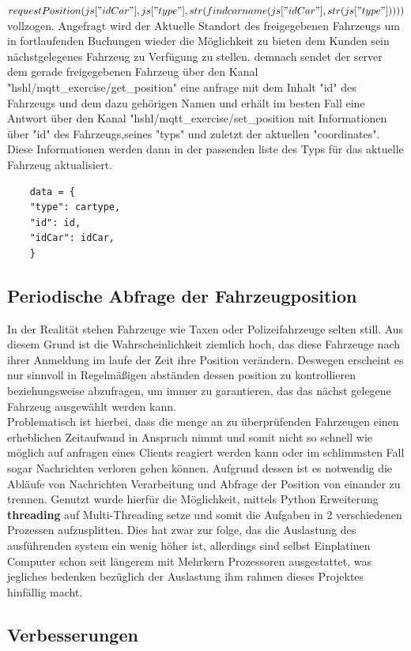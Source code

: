 \documentclass[conference]{IEEEtran}
\begin{document}
\textit{$requestPosition(js["idCar"],js["type"],\\str(findcarname(js["idCar"],str(js["type"]))))$}
vollzogen.  Angefragt wird der Aktuelle Standort des freigegebenen Fahrzeugs um in fortlaufenden Buchungen wieder die Möglichkeit zu bieten dem Kunden sein nächstgelegenes Fahrzeug zu Verfügung zu stellen. demnach sendet der server dem gerade freigegebenen Fahrzeug über den Kanal \textsf{"hshl/mqtt\_exercise/get\_position"} eine anfrage mit dem Inhalt "id" des Fahrzeugs und dem dazu gehörigen Namen und erhält im besten Fall  eine Antwort über den Kanal  \textsf{"hshl/mqtt\_exercise/set\_position} mit Informationen über "id" des Fahrzeugs,seines "typs" und zuletzt der aktuellen "coordinates". Diese Informationen werden dann in der passenden liste des Typs für das aktuelle Fahrzeug aktualisiert.
\begin{lstlisting}
    data = {
    "type": cartype,
    "id": id,
    "idCar": idCar,
    }
\end{lstlisting}
\subsection{Periodische Abfrage der Fahrzeugposition}
In der Realität stehen Fahrzeuge wie Taxen oder Polizeifahrzeuge selten still. Aus diesem Grund ist die Wahrscheinlichkeit ziemlich hoch, das diese Fahrzeuge nach ihrer Anmeldung im laufe der Zeit ihre Position verändern. Deswegen erscheint es nur sinnvoll in Regelmäßigen abständen dessen position zu kontrollieren beziehungsweise abzufragen, um immer zu garantieren, das das nächst gelegene Fahrzeug ausgewählt werden kann.\\ Problematisch ist hierbei, dass die menge an zu überprüfenden Fahrzeugen einen erheblichen Zeitaufwand in Anspruch nimmt und somit nicht so schnell wie möglich auf anfragen eines Clients reagiert werden kann oder im schlimmsten Fall sogar Nachrichten verloren gehen können. Aufgrund dessen ist es notwendig die Abläufe von Nachrichten Verarbeitung und Abfrage der Position von einander zu trennen. Genutzt wurde hierfür die Möglichkeit, mittels Python Erweiterung \textbf{threading} auf Multi-Threading setze und somit die Aufgaben in 2 verschiedenen Prozessen aufzusplitten. Dies hat zwar zur folge, das die Auslastung des ausführenden system ein wenig höher ist, allerdings sind selbst Einplatinen Computer schon seit längerem mit Mehrkern Prozessoren ausgestattet, was jegliches bedenken bezüglich der Auslastung ihm rahmen dieses Projektes hinfällig macht.
\subsection{Verbesserungen}
\end{document}
